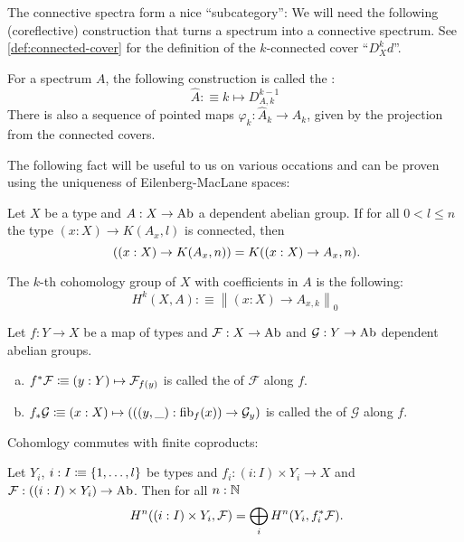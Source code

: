 The connective spectra form a nice ``subcategory'':
We will need the following (coreflective) construction that turns a spectrum into a connective spectrum.
See \cref{def:connected-cover} for the definition of the $k$-connected cover ``$D^k_Xd$''.

\begin{definition}
  For a spectrum $A$,
  the following construction is called the :
  \[ \hat{A}:\equiv k\mapsto D_{A,k}^{k-1}\]
  There is also a sequence of pointed maps $\varphi_k:\hat{A}_k\to A_k$, given by the projection from the connected covers.
\end{definition}

The following fact will be useful to us on various occations and can be proven using the uniqueness of Eilenberg-MacLane spaces:

\begin{lemma}
  \label{em-comm-pi}
  Let $X$ be a type and $A:X\to\operatorname{Ab}$ a dependent abelian group.
  If for all $0<l\leq n$ the type $(x:X)\to K(A_x,l)$ is connected, then
  \[
    ((x:X)\to K(A_x,n)) = K((x:X)\to A_x,n)
    \rlap{.}
  \]
\end{lemma}

\begin{definition}
  The $k$-th cohomology group of $X$ with coefficients in $A$ is the following:
  \[ H^k(X,A):\equiv\left\|(x:X)\to A_{x,k}\right\|_0 \]
\end{definition}


\begin{definition}
  Let $f:Y\to X$ be a map of types and $\mathcal F:X\to \operatorname{Ab}$ and $\mathcal G:Y\to \operatorname{Ab}$ dependent abelian groups.
  \begin{enumerate}[(a)]
  \item $f^\ast \mathcal F\vcentcolon\mspace{-1.2mu}\equiv (y:Y)\mapsto \mathcal F_{f(y)}$ is called the  of $\mathcal F$ along $f$.
  \item $f_{\ast}\mathcal G\vcentcolon\mspace{-1.2mu}\equiv (x:X)\mapsto (((y,\_):\mathrm{fib}_f(x)) \to \mathcal G_y)$ is called the  of $\mathcal G$ along $f$.
  \end{enumerate}
\end{definition}

Cohomlogy commutes with finite coproducts:

\begin{lemma}
  \label{cohomology-copropduct-direct-sum}
  Let $Y_i$, $i:I\vcentcolon\mspace{-1.2mu}\equiv \{1,\dots,l\}$ be types and $f_i:(i:I)\times Y_i\to X$ and $\mathcal F:((i:I)\times  Y_i)\to\operatorname{Ab}$. Then for all $n:\mathbb{N}$
  \[
    H^n((i:I)\times  Y_i, \mathcal F)=\bigoplus_i H^n(Y_i, f_i^\ast\mathcal F)
    \rlap{.}
  \]
  
\end{lemma}

